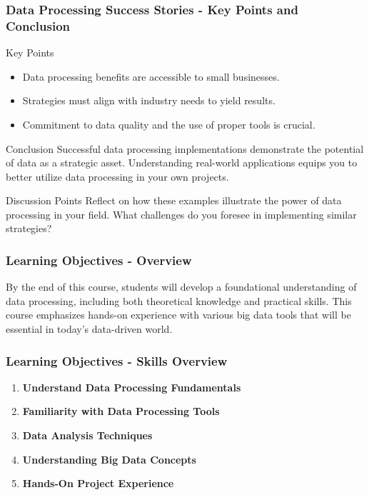 \documentclass[aspectratio=169]{beamer}
\begin{document}
\begin{frame}[fragile]
    \frametitle{Data Processing Success Stories - Key Points and Conclusion}
    \begin{block}{Key Points}
        \begin{itemize}
            \item Data processing benefits are accessible to small businesses.
            \item Strategies must align with industry needs to yield results.
            \item Commitment to data quality and the use of proper tools is crucial.
        \end{itemize}
    \end{block}

    \begin{block}{Conclusion}
        Successful data processing implementations demonstrate the potential of data as a strategic asset. Understanding real-world applications equips you to better utilize data processing in your own projects.
    \end{block}
    
    \begin{block}{Discussion Points}
        Reflect on how these examples illustrate the power of data processing in your field. 
        What challenges do you foresee in implementing similar strategies?
    \end{block}
\end{frame}

\begin{frame}[fragile]
\frametitle{Learning Objectives - Overview}
By the end of this course, students will develop a foundational understanding of data processing, including both theoretical knowledge and practical skills. 
This course emphasizes hands-on experience with various big data tools that will be essential in today’s data-driven world.
\end{frame}

\begin{frame}[fragile]
\frametitle{Learning Objectives - Skills Overview}
\begin{enumerate}
    \item \textbf{Understand Data Processing Fundamentals}
    \item \textbf{Familiarity with Data Processing Tools}
    \item \textbf{Data Analysis Techniques}
    \item \textbf{Understanding Big Data Concepts}
    \item \textbf{Hands-On Project Experience}
\end{enumerate}
\end{frame}
\end{document}

